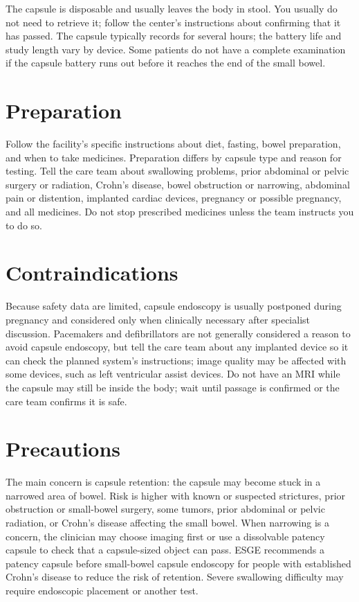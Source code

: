 The capsule is disposable and usually leaves the body in stool. You usually do not need to retrieve it; follow the center's instructions about confirming that it has passed. The capsule typically records for several hours; the battery life and study length vary by device. Some patients do not have a complete examination if the capsule battery runs out before it reaches the end of the small bowel.

\section*{Preparation}
Follow the facility's specific instructions about diet, fasting, bowel preparation, and when to take medicines. Preparation differs by capsule type and reason for testing. Tell the care team about swallowing problems, prior abdominal or pelvic surgery or radiation, Crohn's disease, bowel obstruction or narrowing, abdominal pain or distention, implanted cardiac devices, pregnancy or possible pregnancy, and all medicines. Do not stop prescribed medicines unless the team instructs you to do so.

\section*{Contraindications}
Because safety data are limited, capsule endoscopy is usually postponed during pregnancy and considered only when clinically necessary after specialist discussion. Pacemakers and defibrillators are not generally considered a reason to avoid capsule endoscopy, but tell the care team about any implanted device so it can check the planned system's instructions; image quality may be affected with some devices, such as left ventricular assist devices. Do not have an MRI while the capsule may still be inside the body; wait until passage is confirmed or the care team confirms it is safe.

\section*{Precautions}
The main concern is capsule retention: the capsule may become stuck in a narrowed area of bowel. Risk is higher with known or suspected strictures, prior obstruction or small-bowel surgery, some tumors, prior abdominal or pelvic radiation, or Crohn's disease affecting the small bowel. When narrowing is a concern, the clinician may choose imaging first or use a dissolvable patency capsule to check that a capsule-sized object can pass. ESGE recommends a patency capsule before small-bowel capsule endoscopy for people with established Crohn's disease to reduce the risk of retention. Severe swallowing difficulty may require endoscopic placement or another test.

